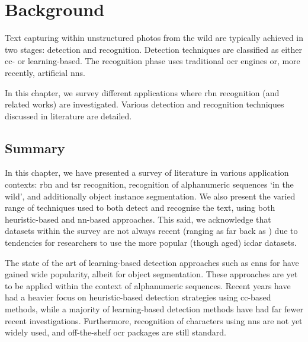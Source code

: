 \chapter{Background}
\label{ch:background}


Text capturing within unstructured photos from the wild are typically achieved in two stages: detection and recognition. Detection techniques are classified as either \gls{cc}- or learning-based. The recognition phase uses traditional \gls{ocr} engines or, more recently, artificial \glspl{nn}. 

In this chapter, we survey different applications where \gls{rbn} recognition (and related works) are investigated. Various detection and recognition techniques discussed in literature are detailed.





\newpage
\section{Summary}

In this chapter, we have presented a survey of literature in various application contexts: \gls{rbn} and \gls{tsr} recognition, recognition of alphanumeric sequences `in the wild', and additionally object instance segmentation. We also present the varied range of techniques used to both detect and recognise the text, using both heuristic-based and \gls{nn}-based approaches. This said, we acknowledge that datasets within the survey are not always recent (ranging as far back as \citeyear{Lucas:2003iw}) due to tendencies for researchers to use the more popular (though aged) \gls{icdar} datasets.

The state of the art of learning-based detection approaches such as \glspl{cnn} for have gained wide popularity, albeit for object segmentation. These approaches are yet to be applied within the context of alphanumeric sequences. Recent years have had a heavier focus on heuristic-based detection strategies using \gls{cc}-based methods, while a majority of learning-based detection methods have had far fewer recent investigations. Furthermore, recognition of characters using \glspl{nn} are not yet widely used, and off-the-shelf \gls{ocr} packages are still standard.